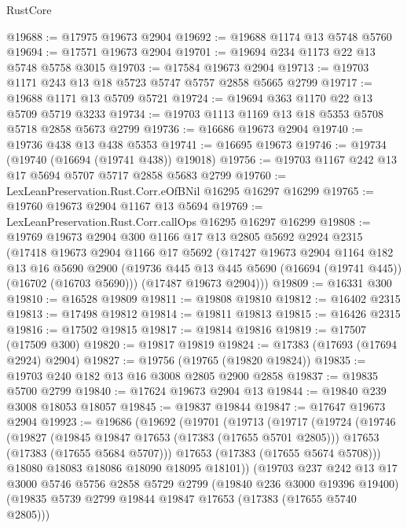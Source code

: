 \begin{lexlean}{RustCore}
\begin{coremodule}
@19688 := @17975 @19673 @2904
@19692 := @19688 @1174 @13 @5748 @5760
@19694 := @17571 @19673 @2904
@19701 := @19694 @234 @1173 @22 @13 @5748 @5758 @3015
@19703 := @17584 @19673 @2904
@19713 := @19703 @1171 @243 @13 @18 @5723 @5747 @5757 @2858 @5665 @2799
@19717 := @19688 @1171 @13 @5709 @5721
@19724 := @19694 @363 @1170 @22 @13 @5709 @5719 @3233
@19734 := @19703 @1113 @1169 @13 @18 @5353 @5708 @5718 @2858 @5673 @2799
@19736 := @16686 @19673 @2904
@19740 := @19736 @438 @13 @438 @5353
@19741 := @16695 @19673
@19746 := @19734 (@19740 (@16694 (@19741 @438)) @19018)
@19756 := @19703 @1167 @242 @13 @17 @5694 @5707 @5717 @2858 @5683 @2799
@19760 := LexLeanPreservation.Rust.Corr.eOfBNil @16295 @16297 @16299
@19765 := @19760 @19673 @2904 @1167 @13 @5694
@19769 := LexLeanPreservation.Rust.Corr.callOps @16295 @16297 @16299
@19808 := @19769
    @19673
    @2904
    @300
    @1166
    @17
    @13
    @2805
    @5692
    @2924
    @2315
    (@17418
      @19673
      @2904
      @1166
      @17
      @5692
      (@17427
        @19673
        @2904
        @1164
        @182
        @13
        @16
        @5690
        @2900
        (@19736 @445 @13 @445 @5690 (@16694 (@19741 @445)) (@16702 (@16703 @5690)))
        (@17487 @19673 @2904)))
@19809 := @16331 @300
@19810 := @16528 @19809
@19811 := @19808 @19810
@19812 := @16402 @2315
@19813 := @17498 @19812
@19814 := @19811 @19813
@19815 := @16426 @2315
@19816 := @17502 @19815
@19817 := @19814 @19816
@19819 := @17507 (@17509 @300)
@19820 := @19817 @19819
@19824 := @17383 (@17693 (@17694 @2924) @2904)
@19827 := @19756 (@19765 (@19820 @19824))
@19835 := @19703 @240 @182 @13 @16 @3008 @2805 @2900 @2858
@19837 := @19835 @5700 @2799
@19840 := @17624 @19673 @2904 @13
@19844 := @19840 @239 @3008 @18053 @18057
@19845 := @19837 @19844
@19847 := @17647 @19673 @2904
@19923 := @19686
    (@19692
      (@19701
        (@19713
          (@19717
            (@19724
              (@19746
                (@19827
                  (@19845 @19847 @17653 (@17383 (@17655 @5701 @2805)))
                  @17653
                  (@17383 (@17655 @5684 @5707)))
                @17653
                (@17383 (@17655 @5674 @5708)))
              @18080
              @18083
              @18086
              @18090
              @18095
              @18101))
          (@19703
            @237
            @242
            @13
            @17
            @3000
            @5746
            @5756
            @2858
            @5729
            @2799
            (@19840 @236 @3000 @19396 @19400)
            (@19835 @5739 @2799 @19844 @19847 @17653 (@17383 (@17655 @5740 @2805)))

\end{coremodule}
\end{lexlean}
